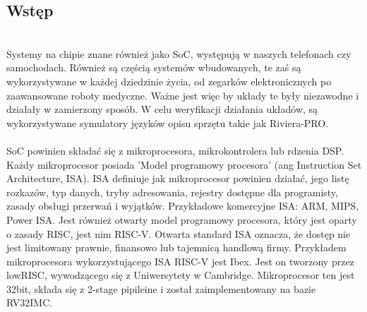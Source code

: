 \documentclass[11pt,a4paper]{article}
\begin{document}
	\subsection{Wstęp}
	\hspace{5mm}
		\\
Systemy na chipie znane również jako SoC, występują w naszych telefonach czy samochodach. Również są częścią systemów wbudowanych, te zaś są wykorzystywane w każdej dziedzinie życia, od zegarków elektronicznych po zaawansowane roboty medyczne. Ważne jest więc by układy te były niezawodne i działały w zamierzony sposób. W celu weryfikacji działania układów, są wykorzystywane symulatory języków opisu sprzętu takie jak Riviera-PRO.
\\
\\
SoC powinien składać się z mikroprocesora, mikrokontrolera lub rdzenia DSP. Każdy mikroprocesor posiada 'Model programowy procesora' (ang Instruction Set Architecture, ISA). ISA definiuje jak mikroprocesor powinien działać, jego listę rozkazów, typ danych, tryby adresowania, rejestry dostępne dla programisty, zasady obsługi przerwań i wyjątków. Przykładowe komercyjne ISA: ARM, MIPS, Power ISA. Jest również otwarty model programowy procesora, który jest oparty o zasady RISC, jest nim RISC-V. Otwarta standard ISA oznacza, że dostęp nie jest limitowany prawnie, finansowo lub tajemnicą handlową firmy.
\newline
\newline
Przykładem mikroprocesora wykorzystującego ISA RISC-V jest Ibex. Jest on tworzony przez lowRISC, wywodzącego się z Uniwersytety w Cambridge. Mikroprocesor ten jest 32bit, składa się z 2-stage pipileine i został zaimplementowany na bazie RV32IMC.
\end{document}
